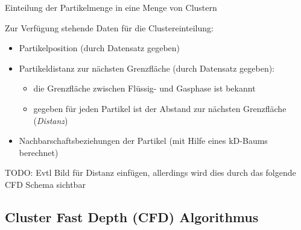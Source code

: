 \documentclass[10pt]{beamer}
\newcommand{\liquid}[1]{\textcolor{blau}{#1}}
\newcommand{\liquidcenter}[1]{\textcolor{blaurot}{#1}}
\newcommand{\wichtig}[1]{\textit{#1}}
\newcommand{\gas}[1]{\textcolor{orange}{#1}}
\begin{document}
\begin{frame}{Einteilung der Partikelmenge in eine Menge von Clustern}

	Zur Verfügung stehende Daten für die Clustereinteilung:
	\begin{itemize}
		\item Partikelposition (durch Datensatz gegeben)
		\item Partikeldistanz zur nächsten Grenzfläche (durch Datensatz gegeben):
		\begin{itemize}
			\item die Grenzfläche zwischen Flüssig- und Gasphase ist bekannt
			\item gegeben für jeden Partikel ist der Abstand zur nächsten Grenzfläche (\wichtig{Distanz})
		\end{itemize}
		\item Nachbarschaftsbeziehungen der Partikel (mit Hilfe eines kD-Baums berechnet)
	\end{itemize}
	TODO: Evtl Bild für Distanz einfügen, allerdings wird dies durch das folgende CFD Schema sichtbar
\end{frame}
	
\subsection{Cluster Fast Depth (CFD) Algorithmus}
\end{document}
